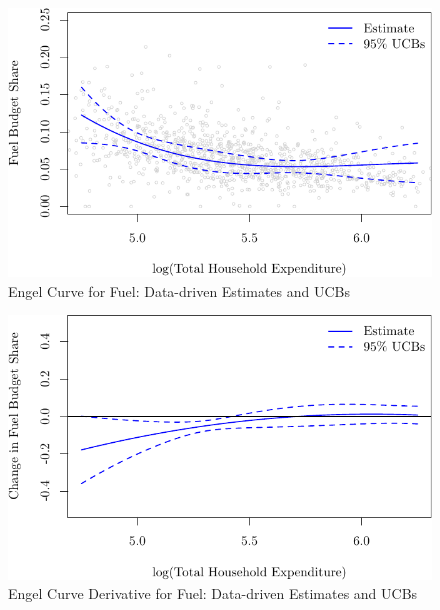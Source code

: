 \documentclass[
]{jss}
\begin{document}
\begin{figure}
\centering
\includegraphics{npiv_files/figure-latex/fuel-dd-1.pdf}
\caption{Engel Curve for Fuel: Data-driven Estimates and UCBs}
\end{figure}

\begin{figure}
\centering
\includegraphics{npiv_files/figure-latex/fuel-dd-deriv-1.pdf}
\caption{Engel Curve Derivative for Fuel: Data-driven Estimates and
UCBs}
\end{figure}


\end{document}
